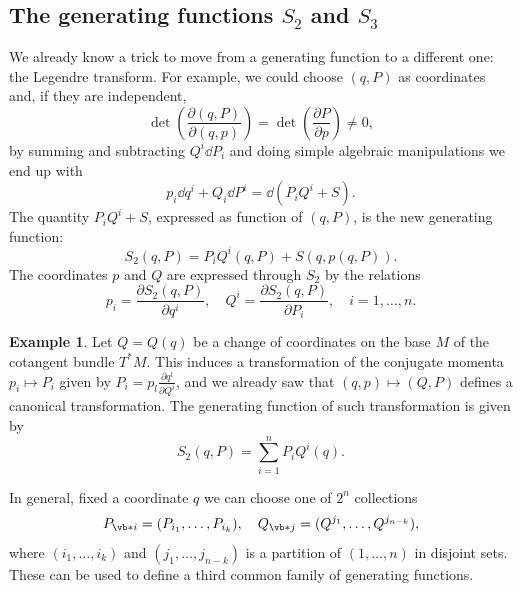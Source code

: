 \documentclass[english,fontsize=11pt,paper=b5]{scrbook}
\theoremstyle{definition}
\newtheorem{example}{Example}[chapter]
\begin{document}
    \subsection{The generating functions $S_2$ and $S_3$}

    We already know a trick to move from a generating function to a different one: the Legendre transform.
    For example, we could choose $(q,P)$ as coordinates and, if they are independent,
    \begin{equation}
      \det\left( \frac{\partial(q,P)}{\partial(q,p)}\right) = \det\left( \frac{\partial P}{\partial p} \right)\neq 0,
    \end{equation}
    by summing and subtracting $Q^i\dd P_i$ and doing simple algebraic manipulations we end up with
    \begin{equation}
      p_i \dd q^i + Q_i \dd P^i = \dd (P_iQ^i + S).
    \end{equation}
    The quantity $P_iQ^i + S$, expressed as function of $(q,P)$, is the new generating function:
    \begin{equation}
      S_2(q,P) = P_i Q^i(q,P) + S(q, p(q,P)).
    \end{equation}
    The coordinates $p$ and $Q$ are expressed through $S_2$ by the relations
    \begin{equation}\label{eq:coordgenfun2}
      p_i = \frac{\partial S_2(q,P)}{\partial q^i},\quad
      Q^i = \frac{\partial S_2(q,P)}{\partial P_i},\quad
      i=1,\ldots,n.
    \end{equation}

    \begin{example}
      Let $Q=Q(q)$ be a change of coordinates on the base $M$ of the cotangent bundle $T^*M$.
      This induces a transformation of the conjugate momenta $p_i\mapsto P_i$ given by $P_i = p_l \frac{\partial q^l}{\partial Q^i}$, and we already saw that $(q,p)\mapsto(Q,P)$ defines a canonical transformation.
      The generating function of such transformation is given by
      \begin{equation}
        S_2(q,P) = \sum_{i=1}^n P_i Q^i(q).
      \end{equation}
    \end{example}

    In general, fixed a coordinate $q$ we can choose one of $2^n$ collections
    \begin{equation}\label{eq:PQcollection}
      P_{\vb*{i}} = (P_{i_1}, \ldots, P_{i_k}), \quad
      Q_{\vb*{j}} = (Q^{j_1}, \ldots, Q^{j_{n-k}}),
    \end{equation}
    where $(i_1, \ldots, i_k)$ and $(j_1, \ldots, j_{n-k})$ is a partition of $(1,\ldots,n)$ in disjoint sets.
    These can be used to define a third common family of generating functions.
\end{document}
